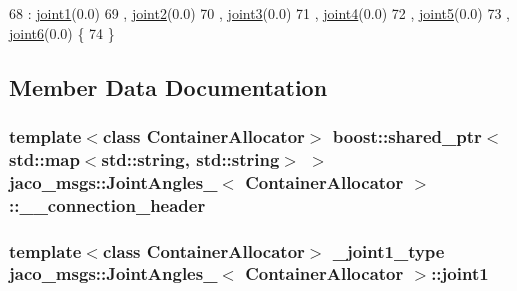 \begin{DoxyCode}
68     : \hyperlink{structjaco__msgs_1_1JointAngles___a5ebadd874f74af99d452dc42787489b7}{joint1}(0.0)
69     , \hyperlink{structjaco__msgs_1_1JointAngles___ad7bfb312caeafc6b2cb1fc02c6a3e116}{joint2}(0.0)
70     , \hyperlink{structjaco__msgs_1_1JointAngles___ae8e5d407b34f0a6acd368ec1a28df526}{joint3}(0.0)
71     , \hyperlink{structjaco__msgs_1_1JointAngles___accb31f45f3a313794a9cab57b8a9b952}{joint4}(0.0)
72     , \hyperlink{structjaco__msgs_1_1JointAngles___ad02e456e0b382b2bf59b4eeb93318921}{joint5}(0.0)
73     , \hyperlink{structjaco__msgs_1_1JointAngles___a474d9f2a0e329ba6bd08c8fa265e9a50}{joint6}(0.0)  \{
74     \}
\end{DoxyCode}


\subsection{Member Data Documentation}
\subsubsection[{\texorpdfstring{\+\_\+\+\_\+connection\+\_\+header}{__connection_header}}]{\setlength{\rightskip}{0pt plus 5cm}template$<$class Container\+Allocator$>$ boost\+::shared\+\_\+ptr$<$std\+::map$<$std\+::string, std\+::string$>$ $>$ {\bf jaco\+\_\+msgs\+::\+Joint\+Angles\+\_\+}$<$ Container\+Allocator $>$\+::\+\_\+\+\_\+connection\+\_\+header}\hypertarget{structjaco__msgs_1_1JointAngles___ad654dc4172c053245e7b7db38a215604}{}\label{structjaco__msgs_1_1JointAngles___ad654dc4172c053245e7b7db38a215604}
\subsubsection[{\texorpdfstring{joint1}{joint1}}]{\setlength{\rightskip}{0pt plus 5cm}template$<$class Container\+Allocator$>$ {\bf \+\_\+joint1\+\_\+type} {\bf jaco\+\_\+msgs\+::\+Joint\+Angles\+\_\+}$<$ Container\+Allocator $>$\+::joint1}\hypertarget{structjaco__msgs_1_1JointAngles___a5ebadd874f74af99d452dc42787489b7}{}\label{structjaco__msgs_1_1JointAngles___a5ebadd874f74af99d452dc42787489b7}
